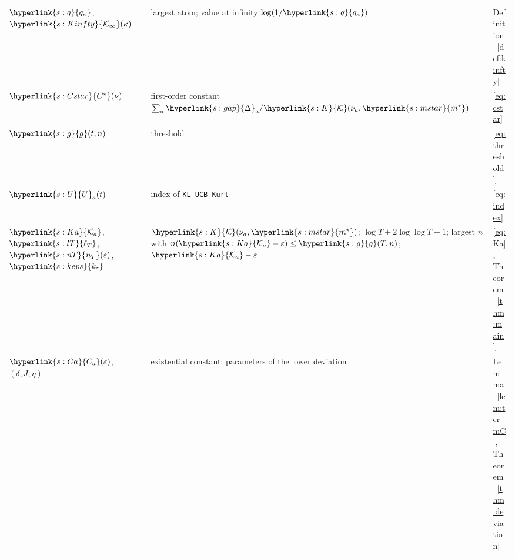 \documentclass[11pt]{article}
\newcommand{\sy}[2]{{\hyperlink{#1}{#2}}}
\newcommand{\mstar}{\sy{s:mstar}{m^{\star}}}
\newcommand{\gap}{\sy{s:gap}{\Delta}}
\newcommand{\Kc}{\sy{s:K}{\mathcal{K}}}
\newcommand{\qk}{\sy{s:q}{q_{\kappa}}}
\newcommand{\Kinfty}{\sy{s:Kinfty}{\mathcal{K}_{\infty}}}
\newcommand{\Cst}{\sy{s:Cstar}{C^{\star}}}
\newcommand{\thr}{\sy{s:g}{g}}
\newcommand{\Ix}{\sy{s:U}{U}}
\newcommand{\Ka}{\sy{s:Ka}{\mathcal{K}_{a}}}
\newcommand{\LT}{\sy{s:lT}{\ell_{T}}}
\newcommand{\nT}{\sy{s:nT}{n_{T}}}
\newcommand{\kep}{\sy{s:keps}{k_{\varepsilon}}}
\newcommand{\Ca}{\sy{s:Ca}{C_{a}}}
\newcommand{\algo}{\hyperref[alg:kucb]{\texttt{KL-UCB-Kurt}}}
\begin{document}
\begin{center}
\begin{tabular}{@{}p{}p{}p{}@{}}
$\qk$, $\Kinfty(\kappa)$ & largest atom; value at infinity $\log(1/\qk)$ & Definition~\ref{def:kinfty} \\
$\Cst(\nu)$ & first-order constant $\sum_a\gap_a/\Kc(\nu_a,\mstar)$ & \eqref{eq:cstar} \\
$\thr(t,n)$ & threshold & \eqref{eq:threshold} \\
$\Ix_a(t)$ & index of \algo{} & \eqref{eq:index} \\
$\Ka$, $\LT$, $\nT(\varepsilon)$, $\kep$ & $\Kc(\nu_a,\mstar)$; $\log T+2\log\log T+1$; largest $n$ with $n(\Ka-\varepsilon)\le\thr(T,n)$; $\Ka-\varepsilon$ & \eqref{eq:Ka}, Theorem~\ref{thm:main} \\
$\Ca(\varepsilon)$, $(\delta,J,\eta)$ & existential constant; parameters of the lower deviation & Lemma~\ref{lem:termC}, Theorem~\ref{thm:deviation} \\
\bottomrule
\end{tabular}
\end{center}



\end{document}
